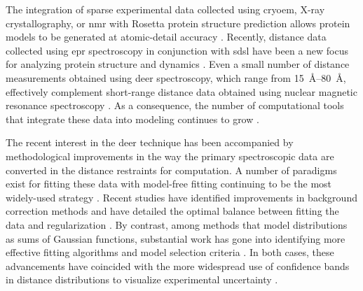 The integration of sparse experimental data collected using \gls{cryoem}, X-ray crystallography, or \gls{nmr} with Rosetta protein structure prediction allows protein models to be generated at atomic-detail accuracy \citep*{Aprahamian2019, Boura2011, Srivastava2020, Steven2008, Xia2017}. Recently, distance data collected using \gls{epr} spectroscopy in conjunction with \gls{sdsl} have been a new focus for analyzing protein structure and dynamics \citep*{Hubbell2000, Hubbell2013, Jeschke2018a, Mchaourab2011}. Even a small number of distance measurements obtained using \gls{deer} spectroscopy, which range from \SIrange{15}{80}{\angstrom}, effectively complement short-range distance data obtained using nuclear magnetic resonance spectroscopy \citep*{Ling2016, Yang2010}. As a consequence, the number of computational tools that integrate these data into modeling continues to grow \citep*{Hays2019, Hirst2011, Marinelli2019}.

The recent interest in the \gls{deer} technique has been accompanied by methodological improvements in the way the primary spectroscopic data are converted in the distance restraints for computation. A number of paradigms exist for fitting these data \citep*{Srivastava2017, Worswick2018} with model-free fitting continuing to be the most widely-used strategy \citep*{Jeschke2006, Jeschke2002}. Recent studies have identified improvements in background correction methods \citep*{FabregasIbanez2020} and have detailed the optimal balance between fitting the data and regularization \citep*{Edwards2018, FabregasIbanez2019}. By contrast, among methods that model distributions as sums of Gaussian functions, substantial work has gone into identifying more effective fitting algorithms and model selection criteria \citep*{FabregasIbanez2020a, Hustedt2018, K.IlkerSen2007, Stein2015, Sweger2020}. In both cases, these advancements have coincided with the more widespread use of confidence bands in distance distributions to visualize experimental uncertainty \citep*{Edwards2016, FabregasIbanez2020a, Hustedt2018, Sweger2020}.

